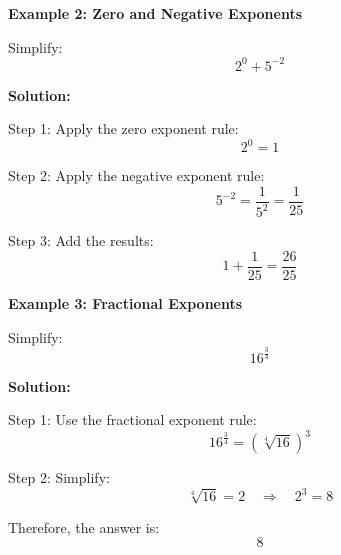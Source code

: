 \begin{flushleft}
\textbf{Example 2: Zero and Negative Exponents}

Simplify:  
\[
2^0 + 5^{-2}
\]

\textbf{Solution:} \vspace{0.2cm}

Step 1: Apply the zero exponent rule:  
\[
2^0 = 1
\]

Step 2: Apply the negative exponent rule:  
\[
5^{-2} = \frac{1}{5^2} = \frac{1}{25}
\]

Step 3: Add the results:  
\[
1 + \frac{1}{25} = \frac{26}{25}
\]
\end{flushleft}

\begin{flushleft}
\textbf{Example 3: Fractional Exponents}

Simplify:  
\[
16^{\frac{3}{4}}
\]

\textbf{Solution:} \vspace{0.2cm}

Step 1: Use the fractional exponent rule:  
\[
16^{\frac{3}{4}} = \left( \sqrt[4]{16} \right)^3
\]

Step 2: Simplify:  
\[
\sqrt[4]{16} = 2 \quad \Rightarrow \quad 2^3 = 8
\]

Therefore, the answer is:  
\[
8
\]
\end{flushleft}
